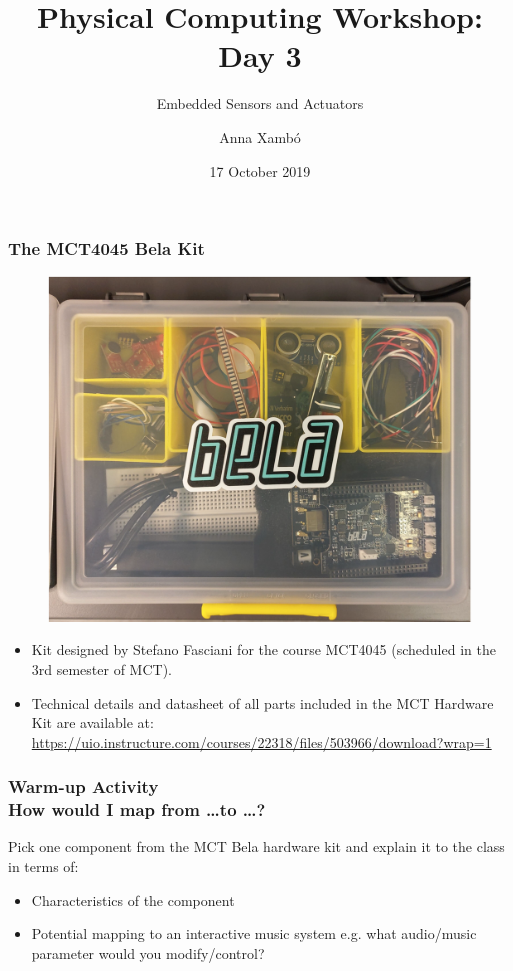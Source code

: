 \documentclass[screen, aspectratio=169]{beamer}
\title[PCW-d1]{Physical Computing Workshop: Day 3}
\subtitle{Embedded Sensors and Actuators}
\author[A. Xamb{\'o}]{Anna Xamb{\'o}}
\institute[NTNU]{Department of Music, NTNU}
\date{17 October 2019}
\begin{document}
\begin{frame}
  \titlepage
\end{frame}
%
\begin{frame}
\frametitle{The MCT4045 Bela Kit}
       \begin{figure}
	\includegraphics[scale=0.25]{img/Bela-kit.png}
	\end{figure}
\begin{itemize}
\item Kit designed by Stefano Fasciani for the course MCT4045 (scheduled in the 3rd semester of MCT).
\item Technical details and datasheet of all parts included in the MCT Hardware Kit are available at:\\ 
\url{https://uio.instructure.com/courses/22318/files/503966/download?wrap=1}
\end{itemize}
\end{frame}
%
\usebackgroundtemplate{}
\begin{frame}
\frametitle{Warm-up Activity\\How would I map from \dots to \dots?}
Pick one component from the MCT Bela hardware kit and explain it to the class in terms of:
\begin{itemize}
\item Characteristics of the component
\item Potential mapping to an interactive music system e.g. what audio/music parameter would you modify/control?
\end{itemize}
\end{frame}
\end{document}

